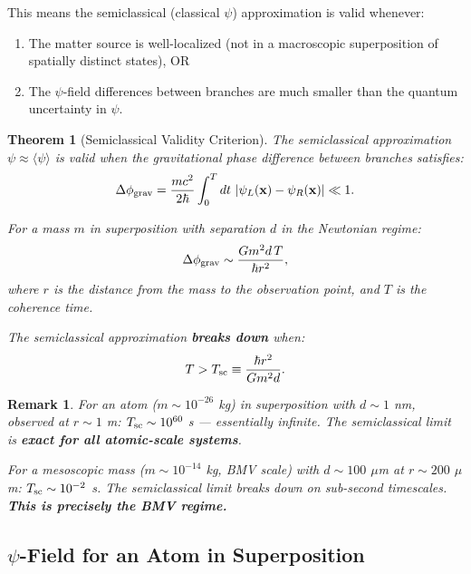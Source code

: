 \documentclass[11pt,a4paper]{article}
\newtheorem{theorem}{Theorem}
\newtheorem{remark}{Remark}
\begin{document}
This means the semiclassical (classical $\psi$) approximation is valid whenever:
\begin{enumerate}
\item The matter source is well-localized (not in a macroscopic superposition of spatially distinct states), OR
\item The $\psi$-field differences between branches are much smaller than the quantum uncertainty in $\psi$.
\end{enumerate}

\begin{theorem}[Semiclassical Validity Criterion]
\label{thm:semiclassical-validity}
The semiclassical approximation $\psi \approx \langle\psi\rangle$ is valid when the gravitational phase difference between branches satisfies:
\begin{equation}
\Delta\phi_{\rm grav} = \frac{mc^2}{2\hbar}\int_0^T dt\,\left|\psi_L(\mathbf{x}) - \psi_R(\mathbf{x})\right| \ll 1.
\end{equation}

For a mass $m$ in superposition with separation $d$ in the Newtonian regime:
\begin{equation}
\Delta\phi_{\rm grav} \sim \frac{Gm^2 d\,T}{\hbar r^2},
\end{equation}
where $r$ is the distance from the mass to the observation point, and $T$ is the coherence time.

The semiclassical approximation \textbf{breaks down} when:
\begin{equation}
T > T_{\rm sc} \equiv \frac{\hbar r^2}{Gm^2 d}.
\end{equation}
\end{theorem}

\begin{remark}
For an atom ($m \sim 10^{-26}$ kg) in superposition with $d \sim 1$ nm, observed at $r \sim 1$ m: $T_{\rm sc} \sim 10^{60}$ s --- essentially infinite. The semiclassical limit is \textbf{exact for all atomic-scale systems}.

For a mesoscopic mass ($m \sim 10^{-14}$ kg, BMV scale) with $d \sim 100$ $\mu$m at $r \sim 200$ $\mu$m: $T_{\rm sc} \sim 10^{-2}$ s. The semiclassical limit breaks down on sub-second timescales. \textbf{This is precisely the BMV regime.}
\end{remark}

\subsection{$\psi$-Field for an Atom in Superposition}
\label{sec:atom-superposition}
\end{document}
